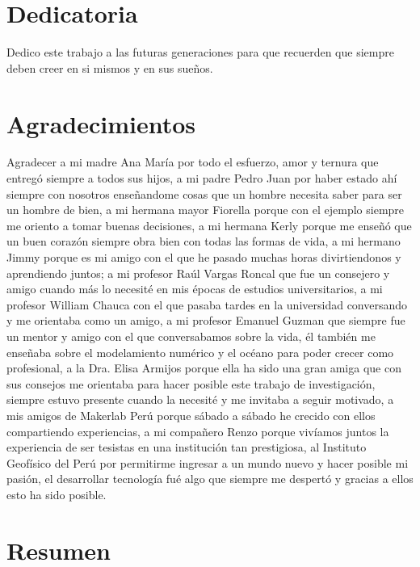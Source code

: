 
\chapter*{Dedicatoria}

Dedico este trabajo a las futuras generaciones para que recuerden que siempre deben creer en si mismos y en sus sueños.


\chapter*{Agradecimientos}

Agradecer a mi madre Ana María por todo el esfuerzo, amor y ternura que entregó siempre a todos sus hijos, a mi padre Pedro Juan por haber estado ahí siempre con nosotros enseñandome cosas que un hombre necesita saber para ser un hombre de bien, a mi hermana mayor Fiorella porque con el ejemplo siempre me oriento a tomar buenas decisiones, a mi hermana Kerly porque me enseñó que un buen corazón siempre obra bien con todas las formas de vida, a mi hermano Jimmy porque es mi amigo con el que he pasado muchas horas divirtiendonos y aprendiendo juntos; a mi profesor Raúl Vargas Roncal que fue un consejero y amigo cuando más lo necesité en mis épocas de estudios universitarios, a mi profesor William Chauca con el que pasaba tardes en la universidad conversando y me orientaba como un amigo, a mi profesor Emanuel Guzman que siempre fue un mentor y amigo con el que conversabamos sobre la vida, él también me enseñaba sobre el modelamiento numérico y el océano para poder crecer como profesional, a la Dra. Elisa Armijos porque ella ha sido una gran amiga que con sus consejos me orientaba para hacer posible este trabajo de investigación, siempre estuvo presente cuando la necesité y me invitaba a seguir motivado, a mis amigos de Makerlab Perú porque sábado a sábado he crecido con ellos compartiendo experiencias, a mi compañero Renzo porque vivíamos juntos la experiencia de ser tesistas en una institución tan prestigiosa, al Instituto Geofísico del Perú por permitirme ingresar a un mundo nuevo y hacer posible mi pasión, el desarrollar tecnología fué algo que siempre me despertó y gracias a ellos esto ha sido posible.





\chapter*{Resumen}

